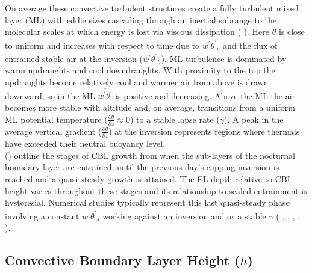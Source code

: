 On average these convective turbulent structures create a fully turbulent mixed layer (\acs{ML}) with eddie sizes cascading through an inertial subrange to the molecular scales at which energy is lost via viscous dissipation (\citeauthor{Stull-BLMetIntro} \citeyear{Stull-BLMetIntro}).  Here $\overline{\theta}$ is close to uniform and increases with respect to time due to $\overline{w^{'}\theta^{'}}_{s}$ and the flux of entrained stable air at the inversion ($\overline{w^{'}\theta^{'}}_{h}$).  \acs{ML} turbulence is dominated by warm updraughts and cool downdraughts.  With proximity to the top the updraughts become relatively cool and warmer air from above is drawn downward, so in the \acs{ML} $\overline{w^{'}\theta^{'}}$ is positive and decreasing.  Above the \acs{ML} the air becomes more stable with altitude and, on average, transitions from a uniform \acs{ML} potential temperature ($\frac{\partial \overline{\theta}}{\partial z} \approx 0$) to a stable lapse rate ($\gamma$).  A peak in the average vertical gradient ($\frac{\partial \overline{\theta}}{\partial z}$) at the inversion represents regions where thermals have exceeded their neutral buoyancy level. \\

\citeauthor{StullNelEl} (\citeyear{StullNelEl}) outline the stages of \acs{CBL} growth from when the sub-layers of the nocturnal boundary layer are entrained, until the previous day's capping inversion is reached and a quasi-steady growth is attained.  The \acs{EL} depth relative to \acs{CBL} height varies throughout these stages and its relationship to scaled entrainment is hysteresial.  Numerical studies typically represent this last quasi-steady phase involving a constant $\overline{w^{'}\theta^{'}}_{s}$ working against an inversion and or a stable $\gamma$ (\citeauthor{SchmidtSchu} \cite{SchmidtSchu}, \citeauthor{Sorbjan} \citeyear{Sorbjan}, \citeauthor{SullMoengStev} \citeyear{SullMoengStev}, \citeauthor{FedConzMir04} \citeyear{FedConzMir04}, \citeauthor{BrooksFowler2} \citeyear{BrooksFowler2}).  

\subsection{Convective Boundary Layer Height ($h$)}
\label{subsec:}

